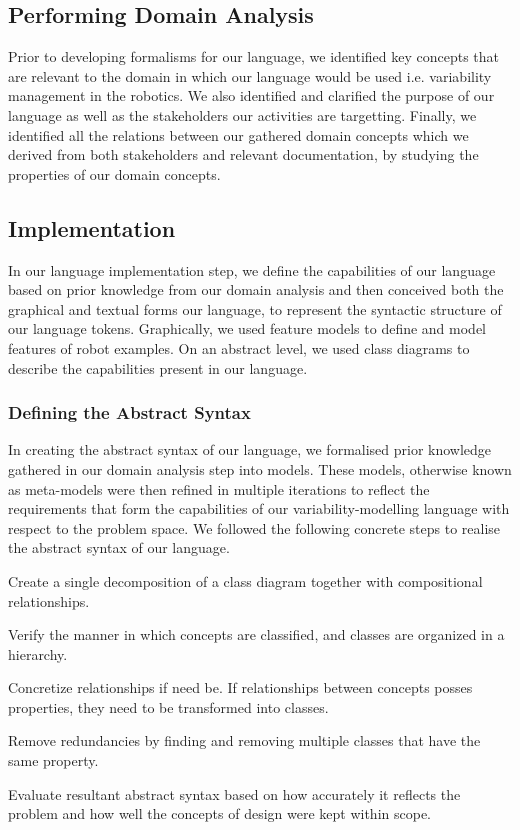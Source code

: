 \documentclass[conference]{IEEEtran}
\begin{document}
\subsection{Performing Domain Analysis}
Prior to developing formalisms for our language, we identified key concepts that are relevant to the domain in which our language would be used i.e. variability management in the robotics. We also identified and clarified the purpose of our language as well as the stakeholders our activities are targetting. Finally, we identified all the relations between our gathered domain concepts which we derived from both stakeholders and relevant documentation, by studying the properties of our domain concepts.

\subsection{Implementation}
In our language implementation step, we define the capabilities of our language based on prior knowledge from our domain analysis and then conceived both the graphical and textual forms our language, to represent the syntactic structure of our language tokens. Graphically, we used feature models to define and model features of robot examples. On an abstract level, we used class diagrams to describe the capabilities present in our language.

\subsubsection{Defining the Abstract Syntax}
In creating the abstract syntax of our language, we formalised prior knowledge gathered in our domain analysis step into models. These models, otherwise known as meta-models were then refined in multiple iterations to reflect the requirements that form the capabilities of our variability-modelling language with respect to the problem space. We followed the following concrete steps to realise the abstract syntax of our language.\begin{enumerate*}
    \item Create a single decomposition of a class diagram together with compositional relationships.
    \item Verify the manner in which concepts are classified, and classes are organized in a hierarchy.
    \item Concretize relationships if need be. If relationships between concepts posses properties, they need to be transformed into classes.
    \item Remove redundancies by finding and removing multiple classes that have the same property.
    \item Evaluate resultant abstract syntax based on how accurately it reflects the problem and how well the concepts of design were kept within scope.
\end{enumerate*}
\end{document}
